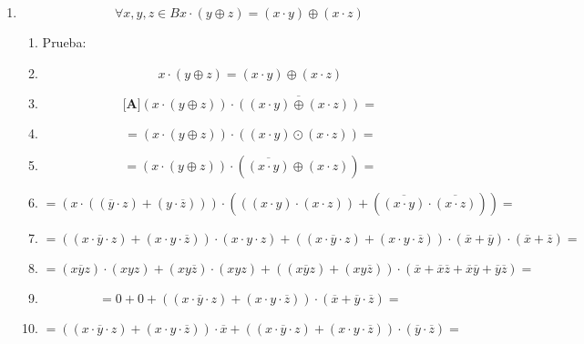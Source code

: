 \begin{enumerate}
\begin{enumerate}
\begin{enumerate}
      \begin{enumerate}
      \def\labelenumiv{\arabic{enumiv}.}
      \item
        \[\forall x,y,{z \in B}{{x \cdot {({y \oplus z})}} = {({x \cdot y})}} \oplus {({x \cdot z})}\]

        \begin{enumerate}
        \def\labelenumv{\arabic{enumv}.}
        \tightlist
        \item
          Prueba:
        \item
          \[{{x \cdot {({y \oplus z})}} = {({x \cdot y})}} \oplus {({x \cdot z})}\]
        \item
          \[{\lbrack\mathbf{A}\rbrack}{{{({x \cdot {({y \oplus z})}})} \cdot \overline{({{({x\cdot y})}\oplus{({x\cdot z})}})}} =}\]
        \item
          \[{= {{({x \cdot {({y \oplus z})}})} \cdot {({{({x \cdot y})} \odot {({x \cdot z})}})}}} =\]
        \item
          \[{= {{({x \cdot {({y \oplus z})}})} \cdot {({\overline{({x\cdot y})} \oplus {({x \cdot z})}})}}} =\]
        \item
          \[{= {{({x \cdot {({{({\overline{y} \cdot z})} + {({y \cdot \overline{z}})}})}})} \cdot {({{({{({x \cdot y})} \cdot {({x \cdot z})}})} + {({\overline{({x\cdot y})} \cdot \overline{({x\cdot z})}})}})}}} =\]
        \item
          \[{= {{{({{({{x \cdot \overline{y}} \cdot z})} + {({{x \cdot y} \cdot \overline{z}})}})} \cdot {({{x \cdot y} \cdot z})}} + {{{({{({{x \cdot \overline{y}} \cdot z})} + {({{x \cdot y} \cdot \overline{z}})}})} \cdot {({\overline{x} + \overline{y}})}} \cdot {({\overline{x} + \overline{z}})}}}} =\]
        \item
          \[{= {{{{({x\overline{y}z})} \cdot {({xyz})}} + {{({xy\overline{z}})} \cdot {({xyz})}}} + {{({{({x\overline{y}z})} + {({xy\overline{z}})}})} \cdot {({{\overline{x} + \overline{x}}{\overline{z} + \overline{x}}{\overline{y} + \overline{y}}\overline{z}})}}}} =\]
        \item
          \[{= {{0 + 0} + {{({{({{x \cdot \overline{y}} \cdot z})} + {({{x \cdot y} \cdot \overline{z}})}})} \cdot {({\overline{x} + {\overline{y} \cdot \overline{z}}})}}}} =\]
        \item
          \[{= {{{({{({{x \cdot \overline{y}} \cdot z})} + {({{x \cdot y} \cdot \overline{z}})}})} \cdot \overline{x}} + {{({{({{x \cdot \overline{y}} \cdot z})} + {({{x \cdot y} \cdot \overline{z}})}})} \cdot {({\overline{y} \cdot \overline{z}})}}}} =\]

\end{enumerate}
\end{enumerate}
\end{enumerate}
\end{enumerate}
\end{enumerate}
